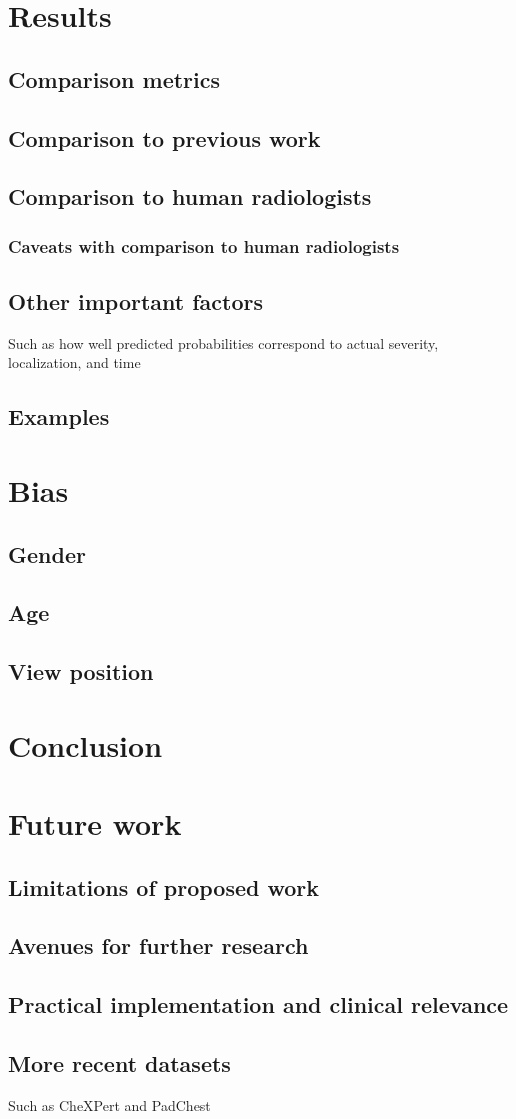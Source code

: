 \documentclass[12pt,twoside,a4paper]{report}
\begin{document}
\chapter{Results\label{res}}
\section{Comparison metrics}
\section{Comparison to previous work}
\section{Comparison to human radiologists}
\subsection{Caveats with comparison to human radiologists}
\section{Other important factors}
Such as how well predicted probabilities correspond to actual severity,
localization, and time
\section{Examples}
\chapter{Bias\label{bias}}
\section{Gender}
\section{Age}
\section{View position}
\chapter{Conclusion}
\chapter{Future work}
\section{Limitations of proposed work}
\section{Avenues for further research}
\section{Practical implementation and clinical relevance\label{practical}}
\section{More recent datasets}
Such as CheXPert and PadChest \printbibliography
\end{document}
